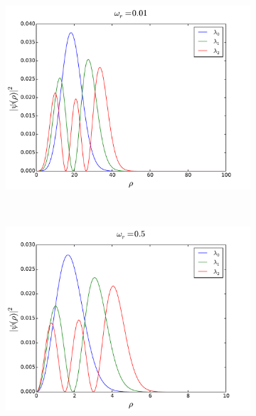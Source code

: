 \documentclass[a4paper, 10pt]{amsart}
\begin{document}
\begin{figure}[h!]
  \centering
  \begin{subfigure}{0.5\textwidth}
    \includegraphics[width=\textwidth]{./plots/schrodinger_200_100_001.pdf}
  \end{subfigure}
  ~
  \begin{subfigure}{0.5\textwidth}
    \includegraphics[width=\textwidth]{./plots/schrodinger_200_10_05.pdf}
  \end{subfigure}
  \begin{subfigure}{0.5\textwidth}

\end{subfigure}
\end{figure}
\end{document}
